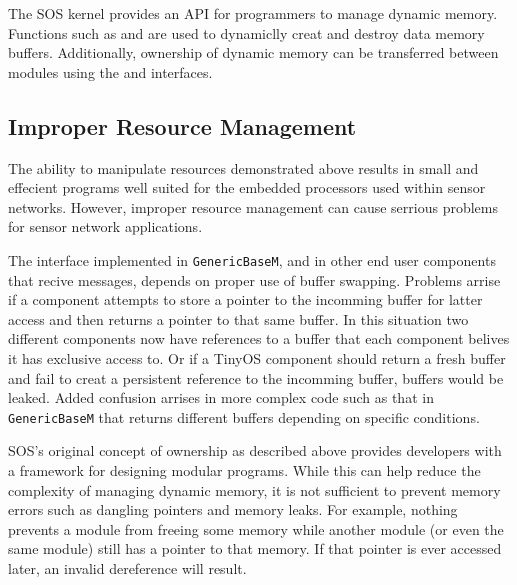 The SOS kernel provides an API for programmers to manage dynamic
memory.  
Functions such as  and  are used to
dynamiclly creat and destroy data memory buffers.  Additionally,
ownership of dynamic memory can be transferred between modules using
the  and  interfaces.




\subsection{Improper Resource Management}

The ability to manipulate resources demonstrated above results in
small and effecient programs well suited for the embedded processors
used within sensor networks.  However, improper resource management
can cause serrious problems for sensor network applications.


\smallskip{}

%
The  interface implemented in {\tt GenericBaseM}, and in
other end user components that recive messages, depends on proper use
of buffer swapping.  Problems arrise if a component attempts to store
a pointer to the incomming buffer for latter access and then returns a
pointer to that same buffer.  In this situation two different
components now have references to a buffer that each component belives
it has exclusive access to.  Or if a TinyOS component should return a
fresh buffer and fail to creat a persistent reference to the
incomming buffer, buffers would be leaked.  Added confusion arrises in
more complex code such as that in {\tt GenericBaseM} that returns
different buffers depending on specific conditions. 


\smallskip{}

%
SOS's original concept of ownership as described above provides
developers with a framework for designing modular programs. While this
can help reduce the complexity of managing dynamic memory, it is not
sufficient to prevent memory errors such as dangling pointers and
memory leaks.  For example, nothing prevents a module from freeing
some memory while another module (or even the same module) still has a
pointer to that memory.  If that pointer is ever accessed later, an
invalid dereference will result.  

